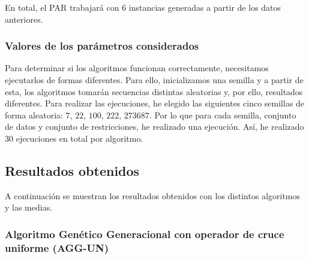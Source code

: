 En total, el PAR trabajará con 6 instancias generadas a partir de los datos anteriores.

\subsubsection{Valores de los parámetros considerados}

Para determinar si los algoritmos funcionan correctamente, necesitamos ejecutarlos de formas diferentes. Para ello, inicializamos 
una semilla y a partir de esta, los algoritmos tomarán secuencias distintas aleatorias y, por ello, resultados diferentes.
Para realizar las ejecuciones, he elegido las siguientes cinco semillas de forma aleatoria: $7$, $22$, $100$, $222$, $273687$.
Por lo que para cada semilla, conjunto de datos y conjunto de restricciones, he realizado una ejecución. Así, he realizado $30$ ejecuciones en total por algoritmo.

\subsection{Resultados obtenidos}

A continuación se muestran los resultados obtenidos con los distintos algoritmos y las medias.

\subsubsection{Algoritmo Genético Generacional con operador de cruce uniforme (AGG-UN)}

